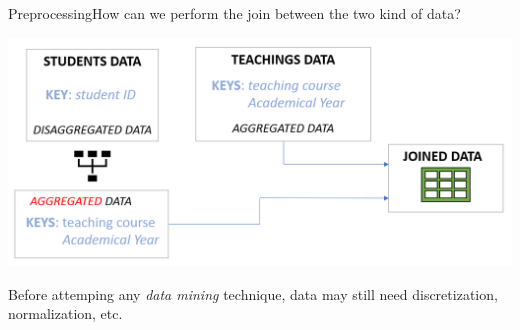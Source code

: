 \begin{frame}{Preprocessing}{How can we perform the join between the two kind of data?}

    \vspace{0.2cm}
    \begin{centering}
        \hspace*{-0.5cm}\includegraphics[scale=0.27]{img8.png}
    \end{centering}

    Before attemping any \emph{data mining} technique, data may still need discretization, normalization, etc.

\end{frame}